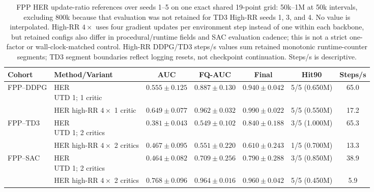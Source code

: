 \begin{table}[t]
\centering
\small
\setlength{\tabcolsep}{5pt}
\begin{tabular}{llccccc}
\toprule
Cohort & Method/Variant & AUC & FQ-AUC & Final & Hit90 & Steps/s \\
\midrule
FPP--DDPG & \shortstack[l]{HER\\UTD 1; 1 critic} & $0.555 \pm 0.125$ & $0.887 \pm 0.130$ & $0.940 \pm 0.042$ & 5/5 (0.650M) & 65.0 \\
 & \shortstack[l]{HER high-RR \(4\times\)\\1 critic} & $0.649 \pm 0.077$ & $0.962 \pm 0.032$ & $0.990 \pm 0.022$ & 5/5 (0.550M) & 17.2 \\
\addlinespace[2pt]
FPP--TD3 & \shortstack[l]{HER\\UTD 1; 2 critics} & $0.381 \pm 0.043$ & $0.549 \pm 0.102$ & $0.840 \pm 0.188$ & 3/5 (1.000M) & 65.3 \\
 & \shortstack[l]{HER high-RR \(4\times\)\\2 critics} & $0.467 \pm 0.095$ & $0.551 \pm 0.220$ & $0.610 \pm 0.243$ & 1/5 (0.700M) & 13.3 \\
\addlinespace[2pt]
FPP--SAC & \shortstack[l]{HER\\UTD 1; 2 critics} & $0.464 \pm 0.082$ & $0.709 \pm 0.256$ & $0.790 \pm 0.288$ & 3/5 (0.850M) & 38.9 \\
 & \shortstack[l]{HER high-RR \(4\times\)\\2 critics} & $0.768 \pm 0.096$ & $0.964 \pm 0.016$ & $0.960 \pm 0.042$ & 5/5 (0.450M) & 5.9 \\
\bottomrule
\end{tabular}
\caption{FPP HER update-ratio references over seeds 1--5 on one exact shared 19-point grid: 50k--1M at 50k intervals, excluding 800k because that evaluation was not retained for TD3 High-RR seeds 1, 3, and 4. No value is interpolated. High-RR \(4\times\) uses four gradient updates per environment step instead of one within each backbone, but retained configs also differ in procedural/runtime fields and SAC evaluation cadence; this is not a strict one-factor or wall-clock-matched control. High-RR DDPG/TD3 steps/s values sum retained monotonic runtime-counter segments; TD3 segment boundaries reflect logging resets, not checkpoint continuation. Steps/s is descriptive.}
\label{tab:supp-high-rr}
\end{table}
